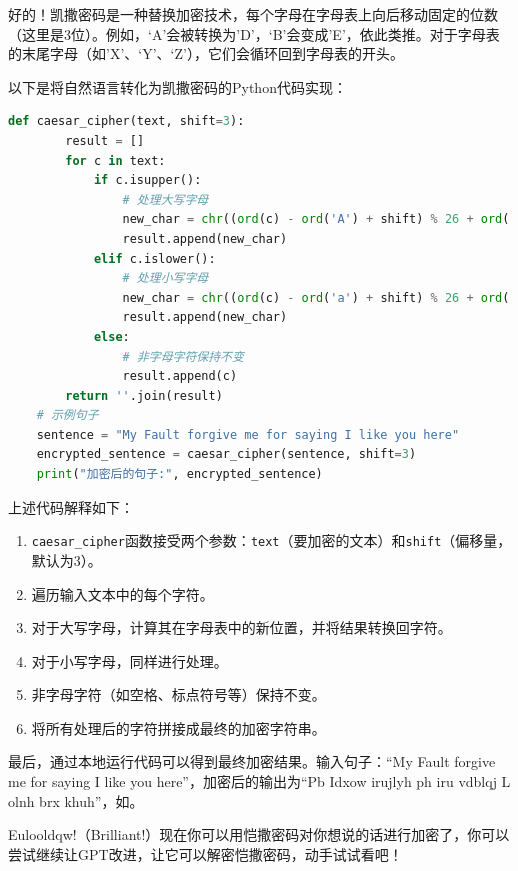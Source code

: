 \begin{gptbox}
\footnotesize{好的！凯撒密码是一种替换加密技术，每个字母在字母表上向后移动固定的位数（这里是3位）。例如，`A'会被转换为'D'，`B'会变成'E'，依此类推。对于字母表的末尾字母（如'X'、`Y'、`Z'），它们会循环回到字母表的开头。

以下是将自然语言转化为凯撒密码的Python代码实现：
}
\small{
\begin{lstlisting}[language=Python]
    def caesar_cipher(text, shift=3):
        result = []
        for c in text:
            if c.isupper():
                # 处理大写字母
                new_char = chr((ord(c) - ord('A') + shift) % 26 + ord('A'))
                result.append(new_char)
            elif c.islower():
                # 处理小写字母
                new_char = chr((ord(c) - ord('a') + shift) % 26 + ord('a'))
                result.append(new_char)
            else:
                # 非字母字符保持不变
                result.append(c)
        return ''.join(result)
    # 示例句子
    sentence = "My Fault forgive me for saying I like you here"
    encrypted_sentence = caesar_cipher(sentence, shift=3)
    print("加密后的句子:", encrypted_sentence)
\end{lstlisting}
}
\end{gptbox}

上述代码解释如下：

\begin{enumerate}
  \def\labelenumi{\arabic{enumi}.}

  \item
        \texttt{caesar\_cipher}函数接受两个参数：\texttt{text}（要加密的文本）和\texttt{shift}（偏移量，默认为3）。
  \item
        遍历输入文本中的每个字符。
  \item
        对于大写字母，计算其在字母表中的新位置，并将结果转换回字符。
  \item
        对于小写字母，同样进行处理。
  \item
        非字母字符（如空格、标点符号等）保持不变。
  \item
        将所有处理后的字符拼接成最终的加密字符串。
\end{enumerate}

最后，通过本地运行代码可以得到最终加密结果。输入句子：``My Fault forgive me for saying I like you here''，加密后的输出为``Pb Idxow irujlyh ph iru vdblqj L olnh brx khuh''，如。


Eulooldqw!（Brilliant!）现在你可以用恺撒密码对你想说的话进行加密了，你可以尝试继续让GPT改进，让它可以解密恺撒密码，动手试试看吧！